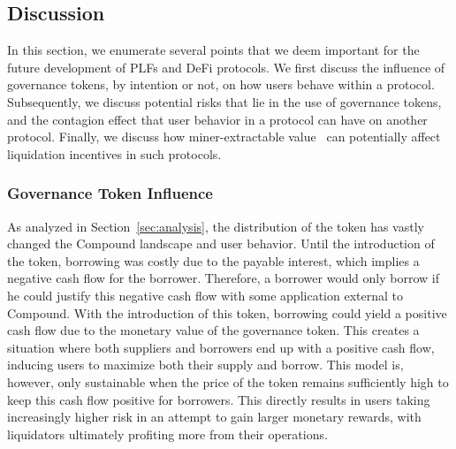 \subsection{Discussion}
\label{sec:discussion}
In this section, we enumerate several points that we deem important for the future development of PLFs and DeFi protocols.
We first discuss the influence of governance tokens, by intention or not, on how users behave within a protocol.
Subsequently, we discuss potential risks that lie in the use of governance tokens, and the contagion effect that user behavior in a protocol can have on another protocol.
Finally, we discuss how miner-extractable value~\cite{daian2020flash} can potentially affect liquidation incentives in such protocols.

\subsubsection{Governance Token Influence}
As analyzed in Section~\ref{sec:analysis}, the distribution of the  token has vastly changed the Compound landscape and user behavior.
Until the introduction of the token, borrowing was costly due to the payable interest, which implies a negative cash flow for the borrower. Therefore, a borrower would only borrow if he could justify this negative cash flow with some application external to Compound.
With the introduction of this token, borrowing could yield a positive cash flow due to the monetary value of the governance token.
This creates a situation where both suppliers and borrowers end up with a positive cash flow, inducing users to maximize both their supply and borrow.
This model is, however, only sustainable when the price of the  token remains sufficiently high to keep this cash flow positive for borrowers.
This directly results in users taking increasingly higher risk in an attempt to gain larger monetary rewards, with liquidators ultimately profiting more from their operations.

